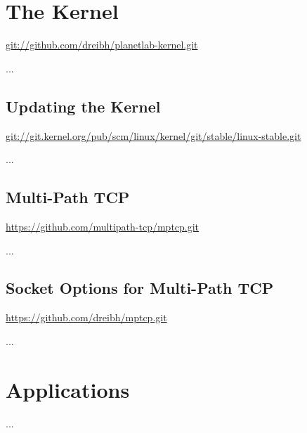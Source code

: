 \section{The Kernel}

\url{git://github.com/dreibh/planetlab-kernel.git}

...

\subsection{Updating the Kernel}

\url{git://git.kernel.org/pub/scm/linux/kernel/git/stable/linux-stable.git}

...

\subsection{Multi-Path TCP}

\url{https://github.com/multipath-tcp/mptcp.git}

...

\subsection{Socket Options for Multi-Path TCP}

\url{https://github.com/dreibh/mptcp.git}

...



\section{Applications}

...

